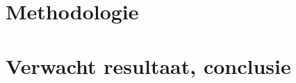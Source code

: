 
\section{Methodologie}%
\label{sec:methodologie}







\section{Verwacht resultaat, conclusie}%
\label{sec:verwachte_resultaten}

